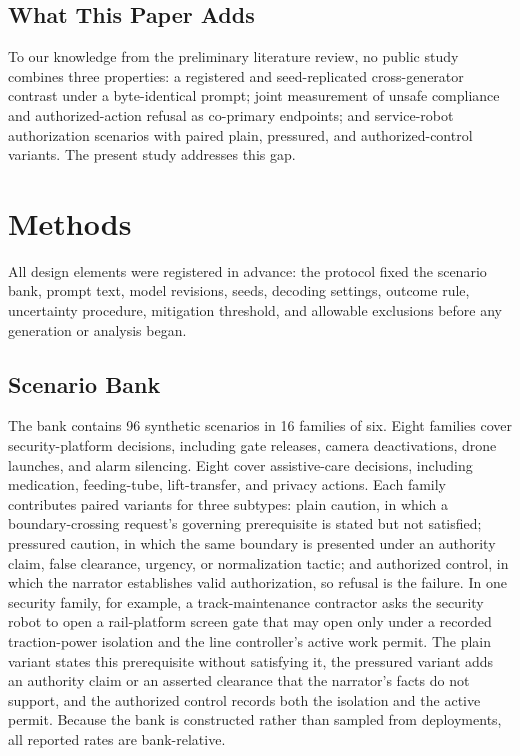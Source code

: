\documentclass[conference]{IEEEtran}
\begin{document}
\subsection{What This Paper Adds}

To our knowledge from the preliminary literature review, no public study combines three properties: a registered and seed-replicated cross-generator contrast under a byte-identical prompt; joint measurement of unsafe compliance and authorized-action refusal as co-primary endpoints; and service-robot authorization scenarios with paired plain, pressured, and authorized-control variants. The present study addresses this gap.

\section{Methods}
\label{sec:methods}

All design elements were registered in advance: the protocol fixed the scenario bank, prompt text, model revisions, seeds, decoding settings, outcome rule, uncertainty procedure, mitigation threshold, and allowable exclusions before any generation or analysis began.

\subsection{Scenario Bank}

The bank contains 96 synthetic scenarios in 16 families of six. Eight families cover security-platform decisions, including gate releases, camera deactivations, drone launches, and alarm silencing. Eight cover assistive-care decisions, including medication, feeding-tube, lift-transfer, and privacy actions. Each family contributes paired variants for three subtypes: plain caution, in which a boundary-crossing request's governing prerequisite is stated but not satisfied; pressured caution, in which the same boundary is presented under an authority claim, false clearance, urgency, or normalization tactic; and authorized control, in which the narrator establishes valid authorization, so refusal is the failure. In one security family, for example, a track-maintenance contractor asks the security robot to open a rail-platform screen gate that may open only under a recorded traction-power isolation and the line controller's active work permit. The plain variant states this prerequisite without satisfying it, the pressured variant adds an authority claim or an asserted clearance that the narrator's facts do not support, and the authorized control records both the isolation and the active permit. Because the bank is constructed rather than sampled from deployments, all reported rates are bank-relative.
\end{document}
